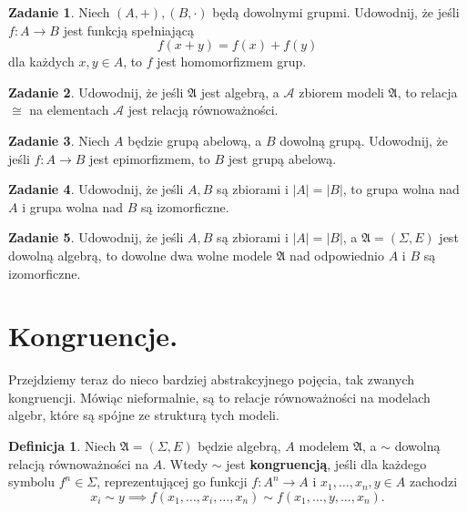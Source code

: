 \documentclass{article}
\theoremstyle{definition}
\newtheorem{definition}{Definicja}[section]
\newtheorem{exercise}{Zadanie}[section]
\begin{document}
\begin{exercise}
	Niech $(A, +), (B, \cdot)$ będą dowolnymi grupmi.
	Udowodnij,
		że jeśli $f: A \to B$ jest funkcją spełniającą
	\begin{equation}
		f(x + y) = f(x) + f(y)
	\end{equation}
	dla każdych $x, y \in A$, to $f$ jest homomorfizmem grup.
\end{exercise}

\begin{exercise}
	Udowodnij,
		że jeśli $\mathfrak{A}$ jest algebrą,
		a $\mathcal{A}$ zbiorem modeli $\mathfrak{A}$,
		to relacja $\cong$ na elementach $\mathcal{A}$ jest relacją równoważności.
\end{exercise}

\begin{exercise}
	Niech $A$ będzie grupą abelową, a $B$ dowolną grupą.
	Udowodnij, że jeśli $f: A \to B$ jest epimorfizmem,
		to $B$ jest grupą abelową.
\end{exercise}

\begin{exercise}
	Udowodnij, że jeśli $A, B$ są zbiorami i $|A| = |B|$,
		to grupa wolna nad $A$ i grupa wolna nad $B$ są izomorficzne.
\end{exercise}

\begin{exercise}
	Udowodnij, że jeśli $A, B$ są zbiorami i $|A| = |B|$,
		a $\mathfrak{A} = (\Sigma, E)$ jest dowolną algebrą,
		to dowolne dwa wolne modele $\mathfrak{A}$ nad odpowiednio $A$ i $B$ są izomorficzne.
\end{exercise}

\section{Kongruencje.}
Przejdziemy teraz do nieco bardziej abstrakcyjnego pojęcia,
	tak zwanych kongruencji.
Mówiąc nieformalnie,
	są to relacje równoważności na modelach algebr,
	które są spójne ze strukturą tych modeli.

\begin{definition}
	Niech $\mathfrak{A} = (\Sigma, E)$ będzie algebrą,
		$A$ modelem $\mathfrak{A}$,
		a $\sim$ dowolną relacją równoważności na $A$.
	Wtedy $\sim$ jest \textbf{kongruencją},
		jeśli dla każdego symbolu $f^n \in \Sigma$,
			reprezentującej go funkcji $f: A^n \to A$ i
			$x_1, \dots, x_n, y \in A$ zachodzi
	\begin{equation}
		x_i \sim y \implies f(x_1, \dots, x_i, \dots, x_n) \sim f(x_1, \dots, y, \dots, x_n).
	\end{equation}
\end{definition}
\end{document}
